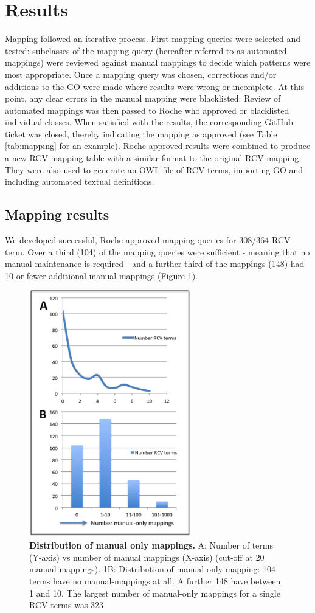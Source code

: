 \documentclass[runningheads,a4paper]{llncs}
\begin{document}
{{\section{Results}

Mapping followed an iterative process.  First mapping queries were selected and tested: subclasses of the mapping query (hereafter referred to as automated mappings) were reviewed against manual mappings to decide which patterns were most appropriate.  Once a mapping query was chosen, corrections and/or additions to the GO were made where results were wrong or incomplete.  At this point, any clear errors in the manual mapping were blacklisted. Review of automated mappings was then passed to Roche who approved or blacklisted individual classes. When satisfied with the results, the corresponding GitHub ticket was closed, thereby indicating the mapping as approved (see Table \ref{tab:mapping}  for an example).  Roche approved results were combined to produce a new RCV mapping table with a similar format to the original RCV mapping.  They were also used to generate an OWL file of RCV terms, importing GO and including automated textual definitions. 

\subsection{Mapping results}

We developed successful, Roche approved mapping queries for 308/364 RCV term.  Over a third (104) of the mapping queries were sufficient - meaning that no manual maintenance is required - and a further third of the mappings (148) had 10 or fewer additional manual mappings (Figure \ref{fig:man_only}). 
 
\begin{figure}
\centering
\includegraphics[width=70mm]{man_only.png}
\caption{\textbf{Distribution of manual only mappings.} A: Number of terms (Y-axis) vs number of manual mappings (X-axis) (cut-off at 20 manual mappings). 1B: Distribution of manual only mapping: 104 terms have no manual-mappings at all.  A further 148 have between 1 and 10.  The largest number of manual-only mappings for a single RCV terms was 323}
\label{fig:man_only}
\end{figure}
 
}}
\end{document}
